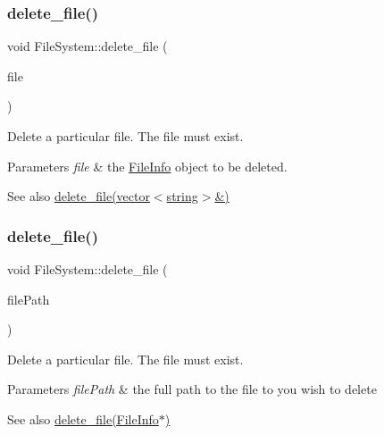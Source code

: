 \subsubsection{\texorpdfstring{delete\+\_\+file()}{delete\_file()}\hspace{0.1cm}{\footnotesize\ttfamily [1/2]}}
{\footnotesize\ttfamily void File\+System\+::delete\+\_\+file (\begin{DoxyParamCaption}\item[{\mbox{\hyperlink{class_file_info}{File\+Info}} $\ast$}]{file }\end{DoxyParamCaption})}

Delete a particular file. The file must exist. 
\begin{DoxyParams}{Parameters}
{\em file} & the \mbox{\hyperlink{class_file_info}{File\+Info}} object to be deleted. \\
\hline
\end{DoxyParams}
\begin{DoxySeeAlso}{See also}
\mbox{\hyperlink{class_file_system_a5620f645c0e25ade03f14ae81432654c}{delete\+\_\+file(vector$<$string$>$\&)}} 
\end{DoxySeeAlso}
\mbox{\label{class_file_system_a5620f645c0e25ade03f14ae81432654c}} 
\subsubsection{\texorpdfstring{delete\+\_\+file()}{delete\_file()}\hspace{0.1cm}{\footnotesize\ttfamily [2/2]}}
{\footnotesize\ttfamily void File\+System\+::delete\+\_\+file (\begin{DoxyParamCaption}\item[{vector$<$ string $>$ \&}]{file\+Path }\end{DoxyParamCaption})}

Delete a particular file. The file must exist. 
\begin{DoxyParams}{Parameters}
{\em file\+Path} & the full path to the file to you wish to delete \\
\hline
\end{DoxyParams}
\begin{DoxySeeAlso}{See also}
\mbox{\hyperlink{class_file_system_a2718456ead4a9e7244c33d4a86cb844c}{delete\+\_\+file(\+File\+Info$\ast$)}} 
\end{DoxySeeAlso}
\mbox{\label{class_file_system_a7c1842bbdfc9bb43c848b21886dac602}} 
